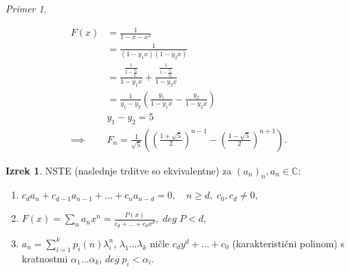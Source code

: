 \documentclass[a4paper, 12pt]{book}
\theoremstyle{definition}
\newtheorem{theorem}[counter]{Izrek}
\theoremstyle{remark}
\newtheorem*{ex}{Primer}
\newcommand{\C}{\mathbb{C}}
\begin{document}
\begin{ex}
\begin{enumerate}[label=(\arabic*)]

      \begin{align*}
        F(x) &= \frac{1}{1-x-x^2} \\
        &= \frac{1}{(1-y_1 x) (1-y_2 x)} \\
        &= \frac{\frac{1}{1-\frac{y_2}{y_1}}}{1-y_1 x} + \frac{\frac{1}{1-\frac{y_1}{y_2}}}{1-y_2 x} \\&= 
        \frac{1}{y_1 - y_2} \left(\frac{y_1}{1-y_1 x} - \frac{y_2}{1-y_2 x}\right) \\
        &y_1 - y_2 = 5 \\
        \implies &F_n = \frac{1}{\sqrt{5}} \left(\left(\frac{1+\sqrt{5}}{2}\right)^{n-1} - \left(\frac{1-\sqrt{5}}{2}\right)^{n+1}\right).
      \end{align*}
  \end{enumerate}
\end{ex}
\begin{theorem}
  NSTE (naslednje trditve so ekvivalentne) za $(a_n)_n, a_n \in \C$:
  \begin{enumerate}[label=(\arabic*)]
    \item $c_d a_n + c_{d-1} a_{n-1} + \dots + c_n a_{n-d} = 0, \quad n \geq d, \; c_0,c_d \neq 0$,
    \item $F(x) = \sum_n a_n x^n = \frac{P(x)}{c_d + \dots + c_0 x^d}, \; deg \; P < d$,
    \item $a_n = \sum_{i=1}^{k} p_i(n) \lambda_i^n$, $\lambda_1 \dots \lambda_k$ ničle $c_d y^d + \dots + c_0$
      (karakteristični polinom) s kratnostmi $\alpha_1 \dots \alpha_k$, $deg \; p_i < \alpha_i$.
  \end{enumerate}
\end{theorem}
\end{document}

